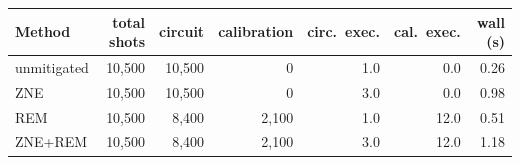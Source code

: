 \begin{tabular}{@{}lrrrrrr@{}}
\toprule
Method & total shots & circuit & calibration & circ.\ exec. & cal.\ exec. & wall (s) \\
\midrule
unmitigated & 10,500 & 10,500 & 0 & 1.0 & 0.0 & 0.26 \\
ZNE & 10,500 & 10,500 & 0 & 3.0 & 0.0 & 0.98 \\
REM & 10,500 & 8,400 & 2,100 & 1.0 & 12.0 & 0.51 \\
ZNE+REM & 10,500 & 8,400 & 2,100 & 3.0 & 12.0 & 1.18 \\
\bottomrule
\end{tabular}
